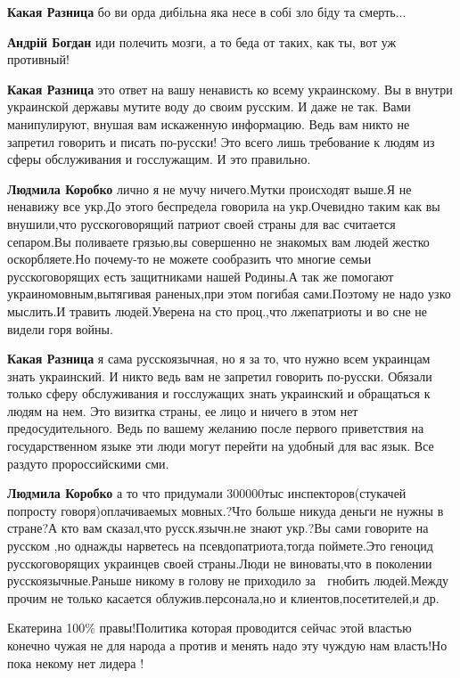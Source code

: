 \begin{itemize}
{\begin{itemize}
\textbf{Какая Разница} бо ви орда дибільна яка несе в собі зло біду та смерть...

\textbf{Андрій Богдан} иди полечить мозги, а то беда от таких, как ты, вот уж противный!

\textbf{Какая Разница} это ответ на вашу ненависть ко всему украинскому. Вы в
внутри украинской державы мутите воду до своим русским. И даже не так. Вами
манипулируют, внушая вам искаженную информацию. Ведь вам никто не запретил
говорить и писать по-русски! Это всего лишь требование к людям из сферы
обслуживания и госслужащим. И это правильно.


\textbf{Людмила Коробко} лично я не мучу ничего.Мутки происходят выше.Я не
ненавижу все укр.До этого беспредела говорила на укр.Очевидно таким как вы
внушили,что русскоговорящий патриот своей страны для вас считается сепаром.Вы
поливаете грязью,вы совершенно не знакомых вам людей жестко оскорбляете.Но
почему-то не можете сообразить что многие семьи русскоговорящих есть
защитниками нашей Родины.А так же помогают украиномовным,вытягивая раненых,при
этом погибая сами.Поэтому не надо узко мыслить.И травить людей.Уверена на сто
проц.,что лжепатриоты и во сне не видели горя войны.

\textbf{Какая Разница} я сама русскоязычная, но я за то, что нужно всем украинцам знать украинский. И никто ведь вам не запретил говорить по-русски. Обязали только сферу обслуживания и госслужащих знать украинский и обращаться к людям на нем. Это визитка страны, ее лицо и ничего в этом нет предосудительного. Ведь по вашему желанию после первого приветствия на государственном языке эти люди могут перейти на удобный для вас язык. Все раздуто пророссийскими сми.

\textbf{Людмила Коробко} а то что придумали 300000тыс инспекторов(стукачей
попросту говоря)оплачиваемых мовных.?Что больше никуда деньги не нужны в
стране?А кто вам сказал,что русск.язычн.не знают укр.?Вы сами говорите на
русском ,но однажды нарветесь на псевдопатриота,тогда поймете.Это геноцид
русскоговорящих украинцев своей страны.Люди не виноваты,что в поколении
русскоязычные.Раньше никому в голову не приходило за 👅 гнобить людей.Между
прочим не только касается облужив.персонала,но и клиентов,посетителей,и др.
\end{itemize}

Екатерина 100\% правы!Политика которая проводится сейчас этой властью конечно
чужая не для народа а против и менять надо эту чуждую нам власть!Но пока некому
нет лидера !

}
\end{itemize}
